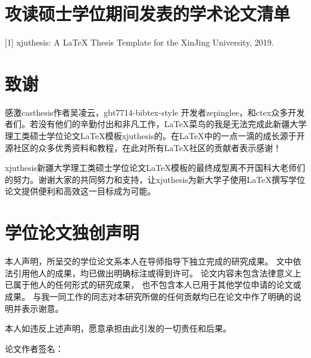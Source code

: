 \chapter{攻读硕士学位期间发表的学术论文清单}


[1] xjuthesis: A LaTeX Thesis Template for the XinJing University, 2019.

\chapter[致谢]{致\quad 谢}%
\thispagestyle{noheaderstyle}%

感激casthesis作者吴凌云，gbt7714-bibtex-style
开发者zepinglee，和ctex众多开发者们。若没有他们的辛勤付出和非凡工作，\LaTeX{}菜鸟的我是无法完成此新疆大学理工类硕士学位论文\LaTeX{}模板xjuthesis的。在\LaTeX{}中的一点一滴的成长源于开源社区的众多优秀资料和教程，在此对所有\LaTeX{}社区的贡献者表示感谢！

xjuthesis新疆大学理工类硕士学位论文\LaTeX{}模板的最终成型离不开国科大老师们的努力。谢谢大家的共同努力和支持，让xjuthesis为新大学子使用\LaTeX{}撰写学位论文提供便利和高效这一目标成为可能。


\chapter{学位论文独创声明}

\thispagestyle{noheaderstyle}%
    \linespread{1.5}
    \vspace*{2ex}

    本人声明，所呈交的学位论文系本人在导师指导下独立完成的研究成果。
    文中依法引用他人的成果，均已做出明确标注或得到许可。
    论文内容未包含法律意义上已属于他人的任何形式的研究成果，
    也不包含本人已用于其他学位申请的论文或成果。
    与我一同工作的同志对本研究所做的任何贡献均已在论文中作了明确的说明并表示谢意。

    本人如违反上述声明，愿意承担由此引发的一切责任和后果。

    {{论文作者签名：}\hspace*{12em}{日期：~~~~~~年~~~~~~月~~~~~~日}}


